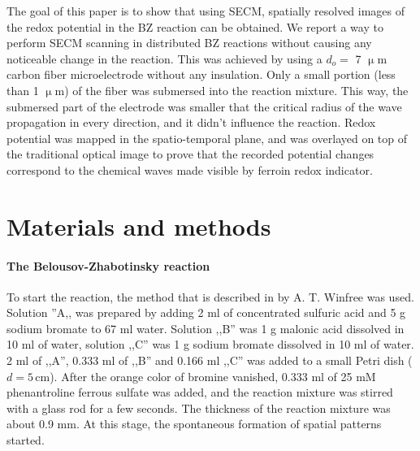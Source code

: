 \documentclass[3p, twocolumn]{elsarticle}
\begin{document}
The goal of this paper is to show that using SECM, spatially resolved images of the redox potential in the BZ reaction can be obtained.
We report a way to perform SECM scanning in distributed BZ reactions without causing any noticeable change in the reaction.
This was achieved by using a $d_o=$ 7 $\upmu$m carbon fiber microelectrode without any insulation.
Only a small portion (less than 1 $\upmu$m) of the fiber was submersed into the reaction mixture.
This way, the submersed part of the electrode was smaller that the critical radius of the wave propagation \cite{critical} in every direction, and it didn't influence the reaction.
Redox potential was mapped in the spatio-temporal plane, and was overlayed on top of the traditional optical image to prove that the recorded potential changes correspond to the chemical waves made visible by ferroin redox indicator.

\section{Materials and methods}
\paragraph{The Belousov-Zhabotinsky reaction} To start the reaction, the method that is described in \cite{winfree} by A. T. Winfree was used.
Solution ''A,, was prepared by adding 2 ml of concentrated sulfuric acid and 5 g sodium bromate to 67 ml water.
Solution ,,B'' was 1 g malonic acid dissolved in 10 ml of water, solution ,,C'' was 1 g sodium bromate dissolved in 10 ml of water.
2 ml of ,,A'', 0.333 ml of ,,B'' and 0.166 ml ,,C'' was added to a small Petri dish ($d=5 \,$cm).
After the orange color of bromine vanished, 0.333 ml of 25 mM phenantroline ferrous sulfate was added, and the reaction mixture was stirred with a glass rod for a few seconds.
The thickness of the reaction mixture was about 0.9 mm.
At this stage, the spontaneous formation of spatial patterns started.
\end{document}
